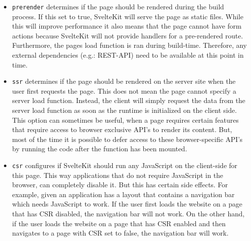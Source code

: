 \begin{itemize}
    \item \texttt{prerender} determines if the page should be rendered during the build process. If this set to true, SvelteKit will serve the page as static files. While this will improve performance it also means that the page cannot have form actions because SvelteKit will not provide handlers for a pre-rendered route. Furthermore, the pages load function is ran during build-time. Therefore, any external dependencies (e.g.: REST-API) need to be available at this point in time.
    
    \item \texttt{ssr} determines if the page should be rendered on the server site when the user first requests the page. This does not mean the page cannot specify a server load function. Instead, the client will simply request the data from the server load function as soon as the runtime is initialized on the client side. This option can sometimes be useful, when a page requires certain features that require access to browser exclusive API's to render its content. But, most of the time it is possible to defer access to these browser-specific API's by running the code after the function has been mounted.

    \item \texttt{csr} configures if SvelteKit should run any JavaScript on the client-side for this page. This way applications that do not require JavaScript in the browser, can completely disable it. But this has certain side effects. For example, given an application has a layout that contains a navigation bar which needs JavaScript to work. If the user first loads the website on a page that has CSR disabled, the navigation bar will not work. On the other hand, if the user loads the website on a page that has CSR enabled and then navigates to a page with CSR set to false, the navigation bar will work.
\end{itemize}